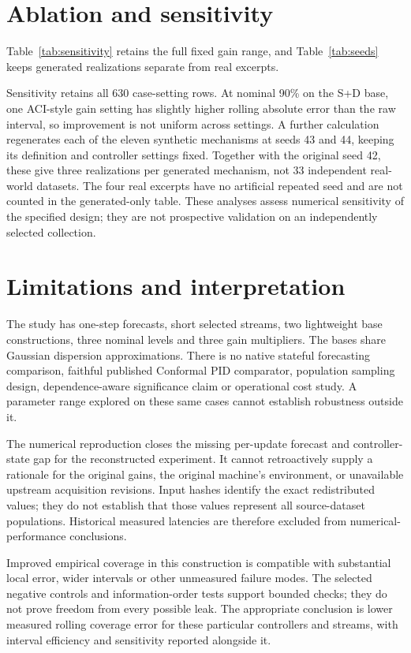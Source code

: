 \documentclass[11pt,a4paper]{article}
\begin{document}
\section{Ablation and sensitivity}
Table~\ref{tab:sensitivity} retains the full fixed gain range, and Table~\ref{tab:seeds} keeps generated realizations separate from real excerpts.


Sensitivity retains all 630 case-setting rows. At nominal 90\% on the S+D base, one ACI-style gain setting has slightly higher rolling absolute error than the raw interval, so improvement is not uniform across settings. A further calculation regenerates each of the eleven synthetic mechanisms at seeds 43 and 44, keeping its definition and controller settings fixed. Together with the original seed 42, these give three realizations per generated mechanism, not 33 independent real-world datasets. The four real excerpts have no artificial repeated seed and are not counted in the generated-only table. These analyses assess numerical sensitivity of the specified design; they are not prospective validation on an independently selected collection.





\section{Limitations and interpretation}
The study has one-step forecasts, short selected streams, two lightweight base constructions, three nominal levels and three gain multipliers. The bases share Gaussian dispersion approximations. There is no native stateful forecasting comparison, faithful published Conformal PID comparator, population sampling design, dependence-aware significance claim or operational cost study. A parameter range explored on these same cases cannot establish robustness outside it.

The numerical reproduction closes the missing per-update forecast and controller-state gap for the reconstructed experiment. It cannot retroactively supply a rationale for the original gains, the original machine's environment, or unavailable upstream acquisition revisions. Input hashes identify the exact redistributed values; they do not establish that those values represent all source-dataset populations. Historical measured latencies are therefore excluded from numerical-performance conclusions.

Improved empirical coverage in this construction is compatible with substantial local error, wider intervals or other unmeasured failure modes. The selected negative controls and information-order tests support bounded checks; they do not prove freedom from every possible leak. The appropriate conclusion is lower measured rolling coverage error for these particular controllers and streams, with interval efficiency and sensitivity reported alongside it.
\end{document}
